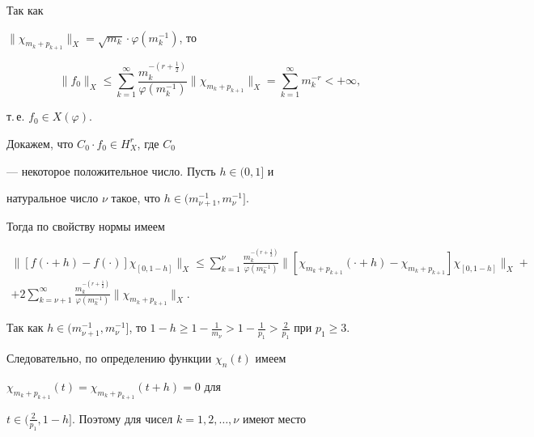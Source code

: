 \begin{pf}


Так как 


$\|\chi_{m_{k}+p_{k+1}}\|_{X}=\sqrt{m_{k}}\cdot 


\varphi(m_{k}^{-1})$, то


$$


\|f_{0}\|_{X}\leq\sum_{k=1}^{\infty} \frac{m_{k}^{-(r+\frac{1}{2})}}{ 


\varphi(m_{k}^{-1})}\|\chi_{m_{k}+p_{k+1}}\|_{X}=\sum_{k=1}^ 


{\infty}m_{k}^{-r}<+\infty,


$$


т.\,е. $f_{0}\in X(\varphi)$.





Докажем, что $C_{0}\cdot f_{0}\in H_{X}^{r}$, где $C_{0}$ 


--- некоторое положительное число. Пусть $h\in (0,1]$ и 


натуральное число $\nu$ такое, что $h\in (m_{\nu+1}^{-1}, m_{\nu}^{-1}]$. 


Тогда по свойству нормы имеем


\begin{multline}


\|[f(\cdot+h)-f(\cdot)]\chi_{[0, 1-h]}\|_{X}\leq


\sum_{k=1}^{\nu} \frac{m_{k}^{-(r+\frac{1}{2})}}{ 


\varphi(m_{k}^{-1})}\|[\chi_{m_{k}+p_{k+1}}(\cdot+h)-\chi_{m_{k}+p_{k+1}}]  


\chi_{[0,1-h]} \|_{X}+ \\


%


+2\sum_{k=\nu+1}^{\infty} \frac{m_{k}^{-(r+\frac{1}{2})}}{ 


\varphi(m_{k}^{-1})}\|\chi_{m_{k}+p_{k+1}}\|_{X}.


\end{multline}


Так как $h\in (m_{\nu+1}^{-1}, m_{\nu}^{-1}]$, то $1-h\geq 


1-\frac{1}{m_{\nu}}>1-\frac{1}{p_{1}}>\frac{2}{p_{1}}$ при $p_{1}\geq 3$. 


Следовательно, по определению функции $\chi_{n}(t)$ имеем  


$\chi_{m_{k}+p_{k+1}}(t)=\chi_{m_{k}+p_{k+1}}(t+h)=0$ для 


$t\in(\frac{2}{p_{1}}, 1-h]$. Поэтому для чисел $k=1,2,\dotsc,\nu$ имеют место 



\end{pf}
